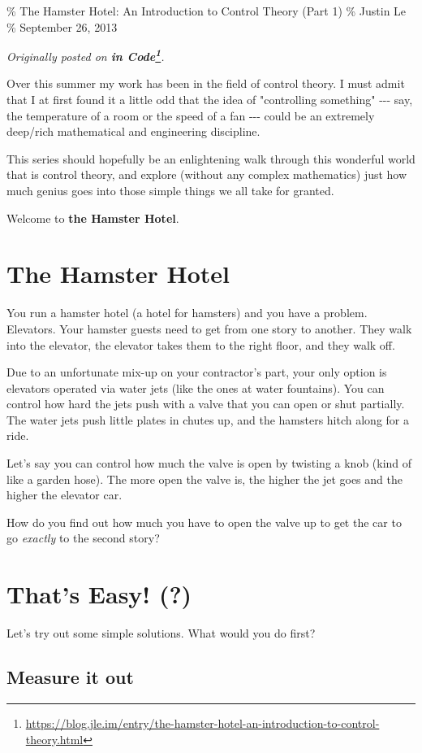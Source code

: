 \documentclass[]{article}
\renewcommand{\href}[2]{#2\footnote{\url{#1}}}
\begin{document}
\% The Hamster Hotel: An Introduction to Control Theory (Part 1) \% Justin Le \%
September 26, 2013

\emph{Originally posted on
\textbf{\href{https://blog.jle.im/entry/the-hamster-hotel-an-introduction-to-control-theory.html}{in
Code}}.}

Over this summer my work has been in the field of control theory. I must admit
that I at first found it a little odd that the idea of "controlling something"
-\/-\/- say, the temperature of a room or the speed of a fan -\/-\/- could be an
extremely deep/rich mathematical and engineering discipline.

This series should hopefully be an enlightening walk through this wonderful
world that is control theory, and explore (without any complex mathematics) just
how much genius goes into those simple things we all take for granted.

Welcome to \textbf{the Hamster Hotel}.

\section{The Hamster Hotel}

You run a hamster hotel (a hotel for hamsters) and you have a problem.
Elevators. Your hamster guests need to get from one story to another. They walk
into the elevator, the elevator takes them to the right floor, and they walk
off.

Due to an unfortunate mix-up on your contractor's part, your only option is
elevators operated via water jets (like the ones at water fountains). You can
control how hard the jets push with a valve that you can open or shut partially.
The water jets push little plates in chutes up, and the hamsters hitch along for
a ride.

Let's say you can control how much the valve is open by twisting a knob (kind of
like a garden hose). The more open the valve is, the higher the jet goes and the
higher the elevator car.

How do you find out how much you have to open the valve up to get the car to go
\emph{exactly} to the second story?

\section{That's Easy! (?)}

Let's try out some simple solutions. What would you do first?

\subsection{Measure it out}
\end{document}
